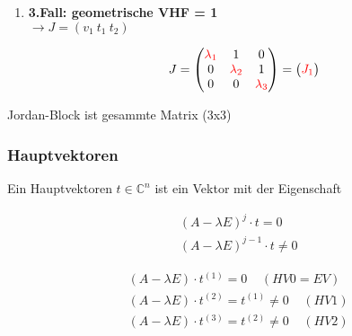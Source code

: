\documentclass[10pt,a4paper]{article}
\begin{document}
\begin{enumerate}[(1)]
    \item \textbf{3.Fall: geometrische VHF = 1}\\
        $\rightarrow J = (v_1 \ t_1 \ t_2)$

  \begin{mdframed}[style=exercise]
    \begin{align}
    J = \begin{pmatrix}
        \textcolor{red}{\lambda_1}  & 1  &  0 \\
             0            & \textcolor{red}{\lambda_2} & 1 \\
             0            & 0              & \textcolor{red}{\lambda_3}
        \end{pmatrix} = 
        \begin{pmatrix}
            \textcolor{red}{J_1} \\
        \end{pmatrix}
    \end{align}
  \end{mdframed}
\end{enumerate}
Jordan-Block ist gesammte Matrix (3x3)

\subsubsection{Hauptvektoren}
Ein Hauptvektoren $t \in \mathbb{C}^n$ ist ein Vektor mit der Eigenschaft 
  \begin{mdframed}[style=exercise]
    \begin{align}
        &(A-\lambda E)^j \cdot t = 0 \\ 
        &(A-\lambda E)^{j-1} \cdot t \neq 0
    \end{align}
  \end{mdframed}

  \begin{mdframed}[style=exercise]
    \begin{align}
        &(A-\lambda E)\cdot t^{(1)} = 0  \ \ \ \ \ (HV0 = EV)\\
        &(A-\lambda E)\cdot t^{(2)} = t^{(1)} \neq 0\ \ \ \ \ (HV1)\\
        &(A-\lambda E)\cdot t^{(3)} = t^{(2)}\neq 0\ \ \ \ \ (HV2) 
    \end{align}
  \end{mdframed}
\end{document}
